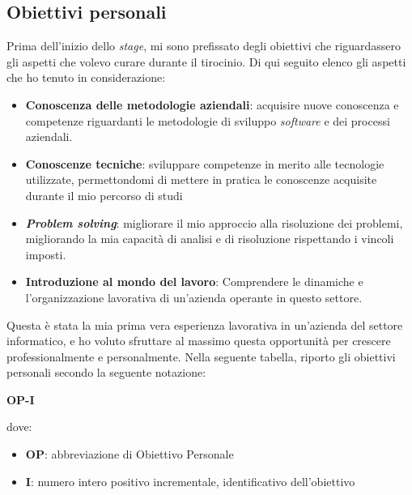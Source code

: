 \subsection{Obiettivi personali} \label{sec:obiettiviPersonali}
Prima dell'inizio dello \textit{stage}, mi sono prefissato degli obiettivi che riguardassero gli aspetti che volevo curare durante il tirocinio. Di qui seguito elenco gli aspetti che ho tenuto in considerazione:
\begin{itemize}
    \item \textbf{Conoscenza delle metodologie aziendali}: acquisire nuove conoscenza e competenze riguardanti le metodologie di sviluppo \textit{software} e dei processi aziendali. 
    \item \textbf{Conoscenze tecniche}: sviluppare competenze in merito alle tecnologie utilizzate, permettondomi di mettere in pratica le conoscenze acquisite durante il mio percorso di studi
    \item \textbf{\textit{Problem solving}}: migliorare il mio approccio alla risoluzione dei problemi, migliorando la mia capacità di analisi e di risoluzione rispettando i vincoli imposti.
    \item \textbf{Introduzione al mondo del lavoro}: Comprendere le dinamiche e l'organizzazione lavorativa di un'azienda operante in questo settore.
\end{itemize}
Questa è stata la mia prima vera esperienza lavorativa in un'azienda del settore informatico, e ho voluto sfruttare al massimo questa opportunità per crescere professionalmente e personalmente.
Nella seguente tabella, riporto gli obiettivi personali secondo la seguente notazione:
\begin{center}
    \textbf{OP-I}
\end{center}
dove:
\begin{itemize}
    \item \textbf{OP}: abbreviazione di Obiettivo Personale
    \item \textbf{I}: numero intero positivo incrementale, identificativo dell'obiettivo
\end{itemize}

